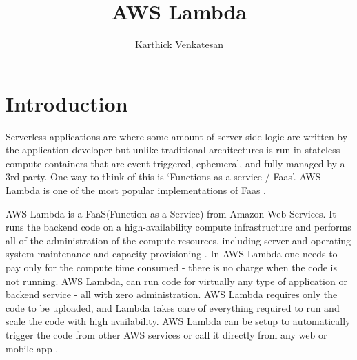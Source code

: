 \documentclass[9pt,twocolumn,twoside]{../../styles/osajnl}
\title{AWS Lambda}
\author[1,*,+]{Karthick Venkatesan}
\affil[1]{School of Informatics and Computing, Bloomington, IN 47408, U.S.A.}
\affil[*]{Corresponding authors: vkarthickprabu@gmail.com}
\affil[+]{HID - S17-IO-3023}
\begin{document}
\maketitle



\section{Introduction}

Serverless applications are where some amount of server-side logic are written 
by the application developer but unlike traditional architectures is run in 
stateless compute containers that are event-triggered, ephemeral, and fully 
managed by a 3rd party. One way to think of this is ‘Functions as a service / 
Faas'. AWS Lambda is one of the most popular implementations of Faas 
\cite{www-Serverless}.


AWS Lambda is a FaaS(Function as a Service)  from Amazon Web Services. It runs 
the backend code on a high-availability compute infrastructure and performs all 
of the administration of the compute resources, including server and operating 
system maintenance and capacity provisioning \cite{www-CouchAWSLambda}.
In AWS Lambda one needs to pay only for the compute time consumed - there is no 
charge when the code is not running. AWS Lambda, can run code for virtually any 
type of application or backend service - all with zero administration. AWS 
Lambda requires only the code to be uploaded, and Lambda takes care of 
everything required to run and scale the code with high availability. AWS 
Lambda can be setup to automatically trigger the code from other AWS services 
or call it directly from any web or mobile app \cite{www-AWSLambda}.
\end{document}
